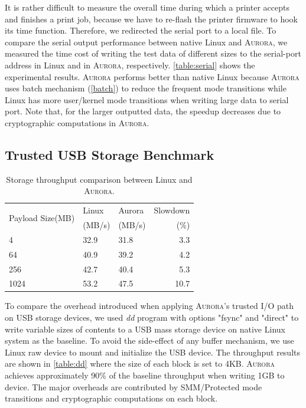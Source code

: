 It is rather difficult to measure the overall time during which a printer accepts and finishes a print job, because we have to re-flash the printer firmware to hook its time function. Therefore, we redirected the serial port to a local file. 
To compare the serial output performance between native Linux and \textsc{Aurora}, we measured the time cost of writing the test data of different sizes to the serial-port address in Linux and in \textsc{Aurora}, respectively. \autoref{table:serial} shows the experimental results. \textsc{Aurora} performs better than native Linux because \textsc{Aurora} uses batch mechanism (\autoref{batch}) to reduce the frequent mode transitions while Linux has more user/kernel mode transitions when writing large data to serial port. Note that, for the larger outputted data, the speedup decreases due to cryptographic computations in \textsc{Aurora}.

\subsection{Trusted USB Storage Benchmark}

\begin{table}[h]	
	\centering
	\caption{Storage throughput comparison between Linux and \textsc{Aurora}.}
	\label{table:dd}
	\small
	\begin{tabular}{lllr}
		\toprule
		\multirow{2}{*}{Payload Size(MB)} &  Linux & Aurora & Slowdown \\ 
		& (MB/s) & (MB/s) & (\%) \\
		\midrule
		4 & 32.9 & 31.8 & 3.3 \\
		64 & 40.9 & 39.2 & 4.2 \\
		256 & 42.7 & 40.4 & 5.3 \\
		1024 & 53.2 & 47.5 & 10.7 \\
		\bottomrule
	\end{tabular}
\end{table}

To compare the overhead introduced when applying \textsc{Aurora}'s trusted I/O path on USB storage devices, we used \emph{dd} program with options "fsync" and "direct" to write variable sizes of contents to a USB mass storage device on native Linux system as the baseline. To avoid the side-effect of any buffer mechanism, we use Linux raw device to mount and initialize the USB device. %
The throughput results are shown in \autoref{table:dd} where the size of each block is set to 4KB. \textsc{Aurora} achieves approximately 90\% of the baseline throughput when writing 1GB to device. The major overheads are contributed by SMM/Protected mode transitions and cryptographic computations on each block.

